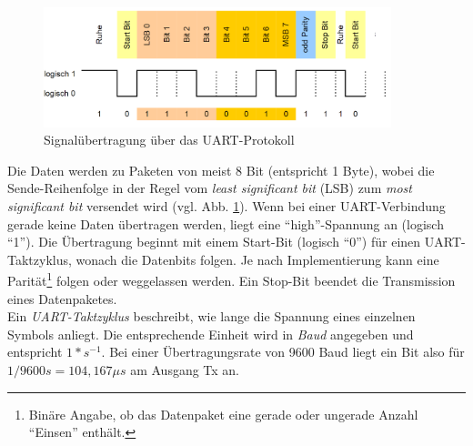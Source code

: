 \begin{figure}[H]
	\centering
   \includegraphics[width=0.90\textwidth]{bilder/uart}
	\caption{Signalübertragung über das UART-Protokoll}
	\label{fig:uart}
\end{figure}

Die Daten werden zu Paketen von meist 8 Bit (entspricht 1 Byte), wobei die Sende-Reihenfolge in der Regel vom \textit{least significant bit} (LSB) zum \textit{most significant bit} versendet wird (vgl. Abb. \ref{fig:uart}). Wenn bei einer UART-Verbindung gerade keine Daten übertragen werden, liegt eine ``high''-Spannung an (logisch ``1''). Die Übertragung beginnt mit einem Start-Bit (logisch ``0'') für einen UART-Taktzyklus, wonach die Datenbits folgen. Je nach Implementierung kann eine Parität\footnote{Binäre Angabe, ob das Datenpaket eine gerade oder ungerade Anzahl ``Einsen'' enthält.} folgen oder weggelassen werden. Ein Stop-Bit beendet die Transmission eines Datenpaketes. \\

Ein \textit{UART-Taktzyklus} beschreibt, wie lange die Spannung eines einzelnen Symbols anliegt. Die entsprechende Einheit wird in \textit{Baud} angegeben und entspricht $1 * s^{-1}$. Bei einer Übertragungsrate von 9600 Baud liegt ein Bit also für $1 / 9600s = 104,167 \mu s$ am Ausgang Tx an. \\

